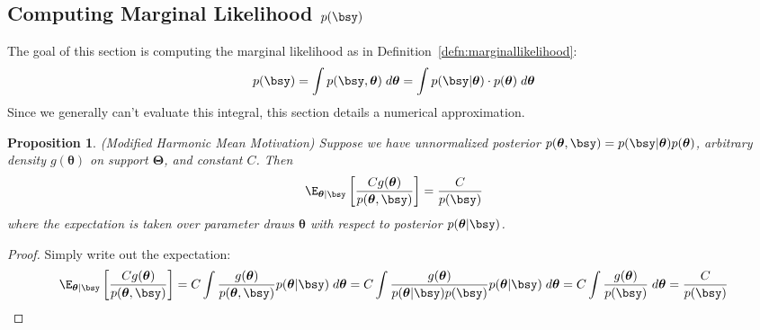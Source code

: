 \documentclass[12pt]{article}
\theoremstyle{plain}
\newtheorem{prop}[thm]{Proposition}
\theoremstyle{definition}
\theoremstyle{remark}
\newcommand{\bstheta}{\boldsymbol{\theta}}
\newcommand{\bsTheta}{\boldsymbol{\Theta}}
\begin{document}
\clearpage
\subsection{Computing Marginal Likelihood $p(\bsy)$}

The goal of this section is computing the marginal likelihood as in
Definition~\ref{defn:marginallikelihood}:
\begin{equation}
  p(\bsy) = \int p(\bsy, \bstheta) \; d\bstheta =
  \int p(\bsy | \bstheta) \cdot p(\bstheta) \; d\bstheta
\end{equation}
Since we generally can't evaluate this integral, this section
details a numerical approximation.

\begin{prop}\emph{(Modified Harmonic Mean Motivation)}
Suppose we have unnormalized posterior
$p(\bstheta,\bsy)=p(\bsy|\bstheta)p(\bstheta)$, arbitrary density
$g(\bstheta)$ on support $\bsTheta$, and constant $C$.
Then
\begin{align*}
  \E_{\bstheta|\bsy}\left[
    \frac{Cg(\bstheta)}{p(\bstheta,\bsy)}
  \right]
  =
  \frac{C}{p(\bsy)}
\end{align*}
where the expectation is taken over parameter draws $\bstheta$ with
respect to posterior $p(\bstheta|\bsy)$.
\end{prop}
\begin{proof}
Simply write out the expectation:
\begin{align*}
  \E_{\bstheta|\bsy}\left[
    \frac{Cg(\bstheta)}{p(\bstheta,\bsy)}
  \right]
  =
  C
  \int
  \frac{g(\bstheta)}{p(\bstheta,\bsy)}
  p(\bstheta|\bsy)
  \; d\bstheta
  =
  C
  \int
  \frac{g(\bstheta)}{p(\bstheta|\bsy)p(\bsy)}
  p(\bstheta|\bsy)
  \; d\bstheta
  =
  C
  \int
  \frac{g(\bstheta)}{p(\bsy)}
  \; d\bstheta
  = \frac{C}{p(\bsy)}
\end{align*}
\end{proof}
\end{document}

